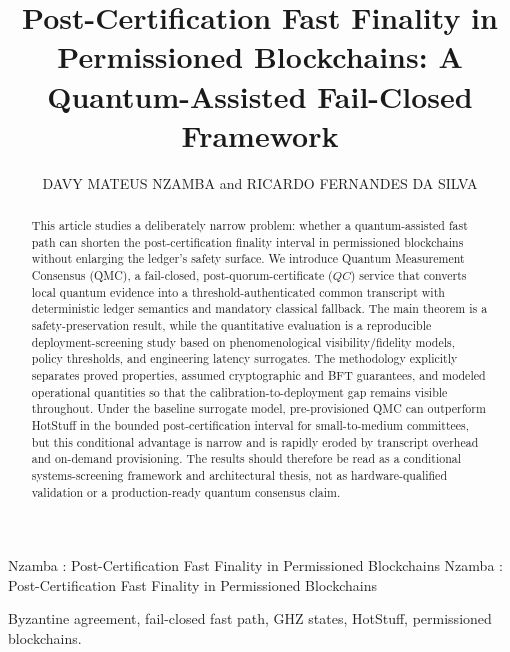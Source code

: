 \documentclass{ieeeaccess}
\begin{document}
\history{}
\doi{}

\title{Post-Certification Fast Finality in Permissioned Blockchains: A Quantum-Assisted Fail-Closed Framework}
\author{\uppercase{Davy Mateus Nzamba} and \uppercase{Ricardo Fernandes da Silva}}

\address[1]{Departamento Academico de Eletrotecnica
Universidade Tecnologica Federal do Parana (UTFPR)
Curitiba, PR, Brazil}
\address[2]{Departamento Academico de Fisica
Universidade Tecnologica Federal do Parana (UTFPR)
Curitiba, PR, Brazil}

\markboth
{Nzamba \headeretal: Post-Certification Fast Finality in Permissioned Blockchains}
{Nzamba \headeretal: Post-Certification Fast Finality in Permissioned Blockchains}


\begin{abstract}
This article studies a deliberately narrow problem: whether a quantum-assisted fast path can shorten the post-certification finality interval in permissioned blockchains without enlarging the ledger's safety surface. We introduce Quantum Measurement Consensus (QMC), a fail-closed, post-quorum-certificate ($QC$) service that converts local quantum evidence into a threshold-authenticated common transcript with deterministic ledger semantics and mandatory classical fallback. The main theorem is a safety-preservation result, while the quantitative evaluation is a reproducible deployment-screening study based on phenomenological visibility/fidelity models, policy thresholds, and engineering latency surrogates. The methodology explicitly separates proved properties, assumed cryptographic and BFT guarantees, and modeled operational quantities so that the calibration-to-deployment gap remains visible throughout. Under the baseline surrogate model, pre-provisioned QMC can outperform HotStuff in the bounded post-certification interval for small-to-medium committees, but this conditional advantage is narrow and is rapidly eroded by transcript overhead and on-demand provisioning. The results should therefore be read as a conditional systems-screening framework and architectural thesis, not as hardware-qualified validation or a production-ready quantum consensus claim.
\end{abstract}

\begin{keywords}
Byzantine agreement, fail-closed fast path, GHZ states, HotStuff, permissioned blockchains.
\end{keywords}
\end{document}
